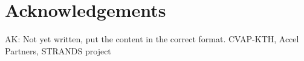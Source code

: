 \documentclass[letterpaper, 10 pt, conference]{ieeeconf}  %
\begin{document}

\section{Acknowledgements}
\label{sec:Acknowledgements}
{\color{blue} AK: Not yet written, put the content in the correct format.}
CVAP-KTH, Accel Partners, STRANDS project



\end{document}
